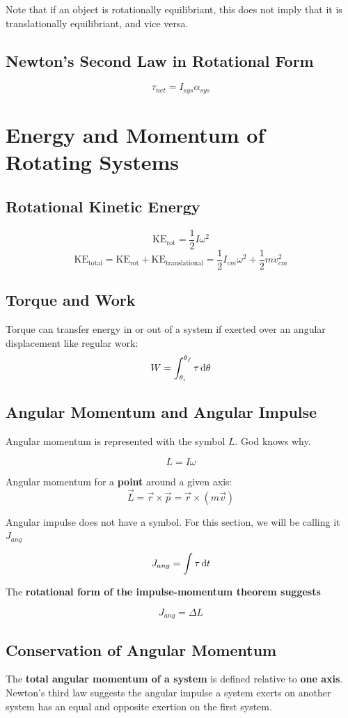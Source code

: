 \documentclass{article}
\begin{document}
Note that if an object is rotationally equilibriant, this does not imply that it is translationally equilibriant, and vice versa.

\subsection{Newton's Second Law in Rotational Form}

\[\tau_{net} = I_{sys} \alpha_{sys}\]

\newpage

\section{Energy and Momentum of Rotating Systems}

\subsection{Rotational Kinetic Energy}
\[\textrm{KE}_{\textrm{rot}} = \frac{1}{2} I\omega^2\]
\[\textrm{KE}_{\textrm{total}} = \textrm{KE}_{\textrm{rot}} + \textrm{KE}_{\textrm{translational}} = \frac{1}{2} I_{cm} \omega^2 + \frac{1}{2} mv_{cm}^2\]

\subsection{Torque and Work}
Torque can transfer energy in or out of a system if exerted over an angular displacement like regular work:
\[W = \int_{\theta_i}^{\theta_f} \tau \odif{\theta}\]

\subsection{Angular Momentum and Angular Impulse}
Angular momentum is represented with the symbol $L$. God knows why.

\[L = I \omega\]

Angular momentum for a \textbf{point} around a given axis:
\[\vec{L} = \vec{r} \times \vec{p} = \vec{r} \times (m \vec{v})\]

Angular impulse does not have a symbol. For this section, we will be calling it $J_{ang}$

\[J_{ang} = \int \tau \odif{t}\]

The \textbf{rotational form of the impulse-momentum theorem suggests}

\[J_{ang} = \Delta L\]

\subsection{Conservation of Angular Momentum}
The \textbf{total angular momentum of a system} is defined relative to \textbf{one axis}.
Newton's third law suggests the angular impulse a system exerts on another system has an equal and opposite exertion on the first system.
\end{document}
